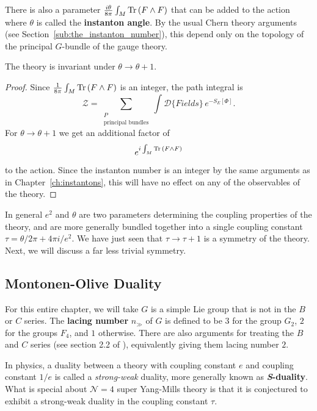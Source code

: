 There is also a parameter $\frac{i \theta}{8\pi} \int_M \mathrm{Tr}\, (F \wedge F)$ that can be added to the action where $\theta$ is called the \textbf{instanton angle}. By the usual Chern theory arguments (see Section~\ref{sub:the_instanton_number}), this depend only on the topology of the principal $G$-bundle of the gauge theory.
\begin{obs}
	The theory is invariant under $\theta \to \theta + 1$.
\end{obs}
\begin{proof}
	Since $\frac{1}{8\pi} \int_M \mathrm{Tr}\, (F \wedge F)$ is an integer, the path integral is
	\[
		\mathcal Z = \sum_{\substack{P \\ \text{principal bundles}}} \int \mathcal D\{ Fields \} \, e^{- S_E[\Phi]}.
	\]
	For $\theta \to \theta+1$ we get an additional factor of 
	\[
		e^{i \int_M \mathrm{Tr}\,(F \wedge F)}
	\] 
	to the action. Since the instanton number is an integer by the same arguments as in Chapter~\ref{ch:instantons}, this will have no effect on any of the observables of the theory.
\end{proof}

In general $e^2$ and $\theta$ are two parameters determining the coupling properties of the theory, and are more generally bundled together into a single coupling constant $\tau = \theta/2\pi + 4\pi i/e^2$. We have just seen that $\tau \to \tau+1$ is a symmetry of the theory. Next, we will discuss a far less trivial symmetry. 


\subsection{Montonen-Olive Duality} %
\label{sub:montonen_olive_duality}

	For this entire chapter, we will take $G$ is a simple Lie group that is not in the $B$ or $C$ series. The \textbf{lacing number} $n_{\gg}$ of $G$ is defined to be $3$ for the group $G_2$, $2$ for the groups $F_4$, and $1$ otherwise. There are also arguments for treating the $B$ and $C$ series (see section 2.2 of \cite{kapustin2006}), equivalently giving them lacing number $2$.

	In physics, a duality between a theory with coupling constant $e$ and coupling constant $1/e$ is called a \emph{strong-weak} duality, more generally known as \textbf{\emph{S}-duality}. What is special about $\mathcal N=4$ super Yang-Mills theory is that it is conjectured to exhibit a strong-weak duality in the coupling constant $\tau$. 
	

